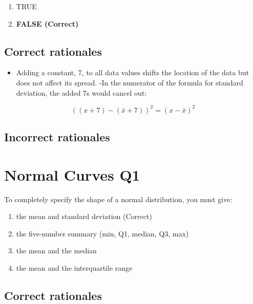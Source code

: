 \documentclass[letterpaper,9pt,twoside,printwatermark=false]{pinp}
\providecommand{\tightlist}{%
  \setlength{\itemsep}{0pt}\setlength{\parskip}{0pt}}
\begin{document}
\begin{enumerate}
\def\labelenumi{\alph{enumi})}
\tightlist
\item
  TRUE
\item
  \textbf{FALSE (Correct)}
\end{enumerate}

\hypertarget{correct-rationales-4}{%
\subsection{Correct rationales}\label{correct-rationales-4}}

\begin{itemize}
\tightlist
\item
  Adding a constant, 7, to all data values shifts the location of the
  data but does not affect its spread. -In the numerator of the formula
  for standard deviation, the added 7s would cancel out:
\end{itemize}

\[((x+7)-(\bar{x}+7))^2 = (x-\bar{x})^2\]

\hypertarget{incorrect-rationales-4}{%
\subsection{Incorrect rationales}\label{incorrect-rationales-4}}

\hypertarget{normal-curves-q1}{%
\section{Normal Curves Q1}\label{normal-curves-q1}}

To completely specify the shape of a normal distribution, you must give:

\begin{enumerate}
\def\labelenumi{\alph{enumi})}
\tightlist
\item
  the mean and standard deviation (Correct)
\item
  the five-number summary (min, Q1, median, Q3, max)
\item
  the mean and the median
\item
  the mean and the interquartile range
\end{enumerate}

\hypertarget{correct-rationales-5}{%
\subsection{Correct rationales}\label{correct-rationales-5}}
\end{document}
